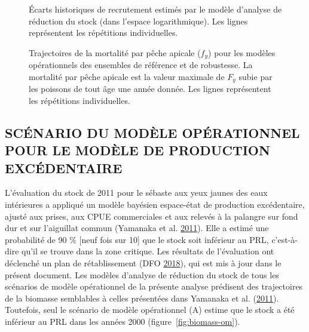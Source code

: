 \documentclass[11pt]{book}
\begin{document}
\begin{figure}[htb]

{\centering {} 

}

\caption{Écarts historiques de recrutement estimés par le modèle d'analyse de réduction du stock (dans l'espace logarithmique). Les lignes représentent les répétitions individuelles.}\label{fig:recdev-om}
\end{figure}

\begin{figure}[htb]

{\centering {} 

}

\caption{Trajectoires de la mortalité par pêche apicale (\(f_y\)) pour les modèles opérationnels des ensembles de référence et de robustesse. La mortalité par pêche apicale est la valeur maximale de \(F_y\) subie par les poissons de tout âge une année donnée. Les lignes représentent les répétitions individuelles.}\label{fig:F-om}
\end{figure}
\clearpage

\hypertarget{scuxe9nario-du-moduxe8le-opuxe9rationnel-pour-le-moduxe8le-de-production-excuxe9dentaire}{%
\subsection{SCÉNARIO DU MODÈLE OPÉRATIONNEL POUR LE MODÈLE DE PRODUCTION EXCÉDENTAIRE}\label{scuxe9nario-du-moduxe8le-opuxe9rationnel-pour-le-moduxe8le-de-production-excuxe9dentaire}}

L'évaluation du stock de 2011 pour le sébaste aux yeux jaunes des eaux intérieures a appliqué un modèle bayésien espace-état de production excédentaire, ajusté aux prises, aux CPUE commerciales et aux relevés à la palangre sur fond dur et sur l'aiguillat commun (Yamanaka et al. \protect\hyperlink{ref-yamanaka2011}{2011}). Elle a estimé une probabilité de 90 \% {[}neuf fois sur 10{]} que le stock soit inférieur au PRL, c'est-à-dire qu'il se trouve dans la zone critique. Les résultats de l'évaluation ont déclenché un plan de rétablissement (DFO \protect\hyperlink{ref-ifmp2018}{2018}), qui est mis à jour dans le présent document. Les modèles d'analyse de réduction du stock de tous les scénarios de modèle opérationnel de la présente analyse prédisent des trajectoires de la biomasse semblables à celles présentées dans Yamanaka et al. (\protect\hyperlink{ref-yamanaka2011}{2011}). Toutefois, seul le scénario de modèle opérationnel (A) estime que le stock a été inférieur au PRL dans les années 2000 (figure~\ref{fig:biomass-om}).
\end{document}
